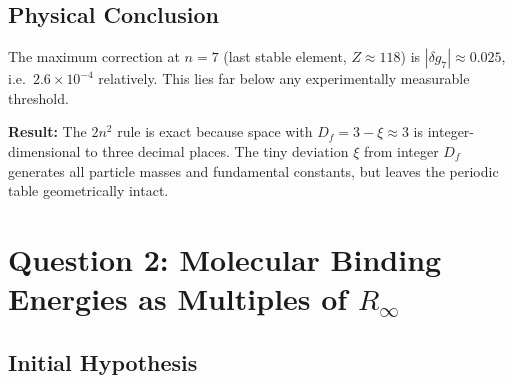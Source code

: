 \begin{table}[htbp]
\centering
\caption{T0 correction of shell degeneracy $g_n^{(\mathrm{T0})} = 2n^{2-\xi}$}
\label{tab:gn-correction}
\end{table}

\subsection{Physical Conclusion}
\label{subsec:conclusion-gn}

The maximum correction at $n=7$ (last stable element, $Z \approx 118$)
is $|\delta g_7| \approx 0.025$, i.e.\ $2.6 \times 10^{-4}$ relatively.
This lies far below any experimentally measurable threshold.

\textbf{Result:} The $2n^2$ rule is exact because space with
$D_f = 3 - \xi \approx 3$ is integer-dimensional to three decimal places.
The tiny deviation $\xi$ from integer $D_f$ generates all
particle masses and fundamental constants, but leaves the periodic table
geometrically intact.

\section{Question 2: Molecular Binding Energies as Multiples of \texorpdfstring{$R_\infty$}{R\_inf}}
\label{sec:binding-energies}

\subsection{Initial Hypothesis}
\label{subsec:hypothesis-be}

